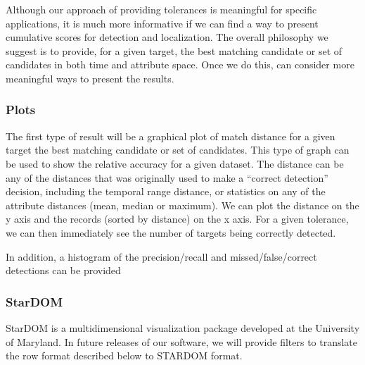 Although our approach of providing tolerances is meaningful for
specific applications, it is much more informative if we can find a
way to present cumulative scores for detection and localization.  The
overall philosophy we suggest is to provide, for a given target, the
best matching candidate or set of candidates in both time and
attribute space.  Once we do this, can consider more meaningful ways to
present the results.

\subsubsection{Plots}
The first type of result will be a graphical plot of match distance
for a given target the best matching candidate or set of candidates.
This type of graph can be used to show the relative accuracy for a
given dataset.  The distance can be any of the distances that was
originally used to make a ``correct detection'' decision, including
the temporal range distance, or statistics on any of the attribute
distances (mean, median or maximum).  We can plot the distance on the
y axis and the records (sorted by distance) on the x axis.  For a
given tolerance, we can then immediately see the number of targets
being correctly detected.

In addition, a histogram of the precision/recall and
missed/false/correct detections can be provided


\subsubsection{StarDOM}

StarDOM is a multidimensional visualization package developed at the
University of Maryland.  In future releases of our software, we will
provide filters to translate the row format described below to STARDOM
format.

\newpage





